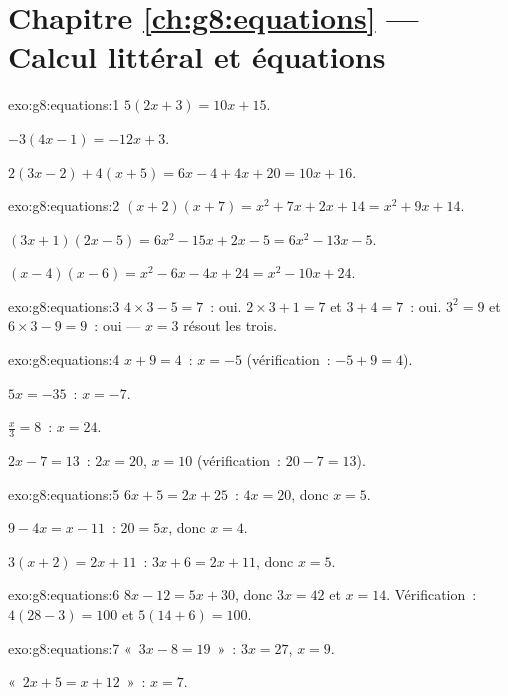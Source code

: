 \section*{Chapitre \ref{ch:g8:equations} --- Calcul littéral et équations}

\begin{solution}{exo:g8:equations:1}
$5(2x + 3) = 10x + 15$.

$-3(4x - 1) = -12x + 3$.

$2(3x - 2) + 4(x + 5) = 6x - 4 + 4x + 20 = 10x + 16$.
\end{solution}

\begin{solution}{exo:g8:equations:2}
$(x+2)(x+7) = x^2 + 7x + 2x + 14 = x^2 + 9x + 14$.

$(3x+1)(2x-5) = 6x^2 - 15x + 2x - 5 = 6x^2 - 13x - 5$.

$(x-4)(x-6) = x^2 - 6x - 4x + 24 = x^2 - 10x + 24$.
\end{solution}

\begin{solution}{exo:g8:equations:3}
$4 \times 3 - 5 = 7$~: oui. \quad
$2 \times 3 + 1 = 7$ et $3 + 4 = 7$~: oui. \quad
$3^2 = 9$ et $6 \times 3 - 9 = 9$~: oui --- $x = 3$ résout les trois.
\end{solution}

\begin{solution}{exo:g8:equations:4}
$x + 9 = 4$~: $x = -5$ (vérification~: $-5 + 9 = 4$).

$5x = -35$~: $x = -7$.

$\frac x3 = 8$~: $x = 24$.

$2x - 7 = 13$~: $2x = 20$, $x = 10$ (vérification~: $20 - 7 = 13$).
\end{solution}

\begin{solution}{exo:g8:equations:5}
$6x + 5 = 2x + 25$~: $4x = 20$, donc $x = 5$.

$9 - 4x = x - 11$~: $20 = 5x$, donc $x = 4$.

$3(x + 2) = 2x + 11$~: $3x + 6 = 2x + 11$, donc $x = 5$.
\end{solution}

\begin{solution}{exo:g8:equations:6}
$8x - 12 = 5x + 30$, donc $3x = 42$ et $x = 14$. Vérification~:
$4(28 - 3) = 100$ et $5(14 + 6) = 100$.
\end{solution}

\begin{solution}{exo:g8:equations:7}
«~$3x - 8 = 19$~»~: $3x = 27$, $x = 9$.

«~$2x + 5 = x + 12$~»~: $x = 7$.
\end{solution}

